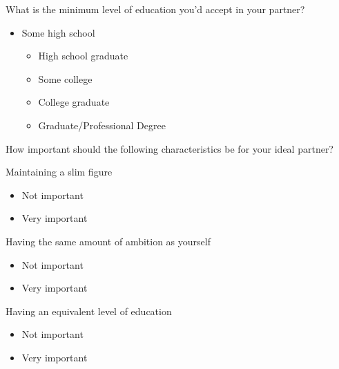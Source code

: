 \documentclass[twoside]{report}
\begin{document}
\begin{multicols}{2}
 What is the minimum level of education you'd accept in your partner?

 \begin{itemize}
  \item
        Some high school

        \begin{itemize}
         \item
               High school graduate
        \end{itemize}

        \begin{itemize}
         \item
               Some college
         \item
               College graduate
         \item
               Graduate/Professional Degree
        \end{itemize}
 \end{itemize}

 How important should the following characteristics be for your ideal partner?

 Maintaining a slim figure

 \begin{itemize}
  \item
        Not important
 \end{itemize}

 \begin{itemize}
  \item
        Very important
 \end{itemize}

 Having the same amount of ambition as yourself

 \begin{itemize}
  \item
        Not important
 \end{itemize}

 \begin{itemize}
  \item
        Very important
 \end{itemize}

 Having an equivalent level of education

 \begin{itemize}
  \item
        Not important
 \end{itemize}

 \begin{itemize}
  \item
        Very important
 \end{itemize}


\end{multicols}
\end{document}
